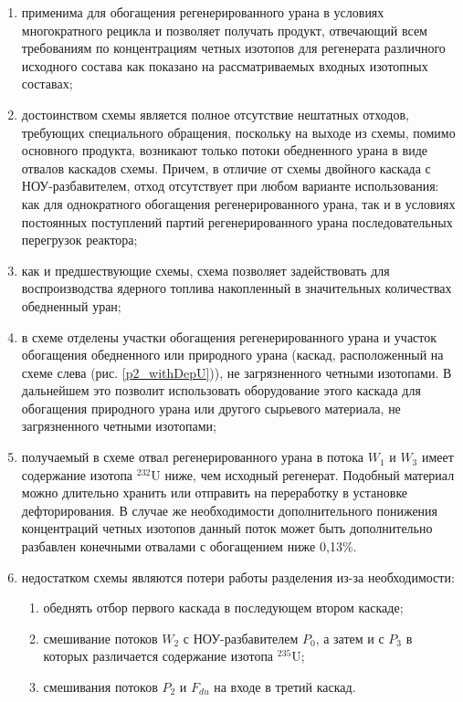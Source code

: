 \begin{enumerate}
    \item применима для обогащения регенерированного урана в условиях многократного рецикла и позволяет получать продукт, отвечающий всем требованиям по концентрациям четных изотопов для регенерата различного исходного состава как показано на рассматриваемых входных изотопных составах;
    \item достоинством схемы является полное отсутствие нештатных отходов, требующих специального обращения, поскольку на выходе из схемы, помимо основного продукта, возникают только потоки обедненного урана в виде отвалов каскадов схемы. Причем, в отличие от схемы двойного каскада с НОУ-разбавителем, отход отсутствует при любом варианте использования: как для однократного обогащения регенерированного урана, так и в условиях постоянных поступлений партий регенерированного урана последовательных перегрузок реактора;
    \item как и предшествующие схемы, схема позволяет задействовать для воспроизводства ядерного топлива накопленный в значительных количествах обедненный уран;
    \item в схеме отделены участки обогащения регенерированного урана и участок обогащения обедненного или природного урана (каскад, расположенный на схеме слева (рис. 
    \ref{p2_withDepU})), не загрязненного четными изотопами. В дальнейшем это позволит использовать оборудование этого каскада для обогащения природного урана или другого сырьевого материала, не загрязненного четными изотопами;
    \item получаемый в схеме отвал регенерированного урана в потока $W_1$ и $W_3$ имеет содержание изотопа $^{232}$U ниже, чем исходный регенерат. Подобный материал можно длительно хранить или отправить на переработку в установке дефторирования. В случае же необходимости дополнительного понижения концентраций четных изотопов данный поток может быть дополнительно разбавлен конечными отвалами с обогащением ниже 0,13\%. 
    \item недостатком схемы являются потери работы разделения из-за необходимости:
    \begin{enumerate}
        \item обеднять отбор первого каскада в последующем втором каскаде;
        \item смешивание потоков $W_2$ с НОУ-разбавителем $P_0$, а затем и с $P_3$ в которых различается содержание изотопа $^{235}$U;
        \item смешивания потоков $P_2$ и $F_{du}$ на входе в третий каскад.
    \end{enumerate}
\end{enumerate}


